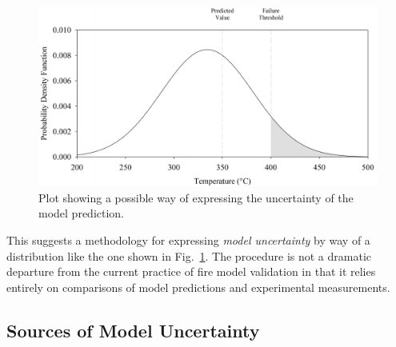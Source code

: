 \begin{figure}[t]
\begin{center}
\includegraphics[width=5.in]{FIGURES/bell_curve}
\end{center}
\caption[Demonstration of model uncertainty.]{Plot showing a possible way of expressing the uncertainty of the model prediction.}
\label{bell_curve}
\end{figure}

This \paper suggests a methodology for expressing {\em model uncertainty} by way of a distribution like the one shown in Fig.~\ref{bell_curve}.
The procedure is not a dramatic departure from the current
practice of fire model validation in that it relies entirely on comparisons of model predictions and experimental measurements.



\subsection{Sources of Model Uncertainty}

